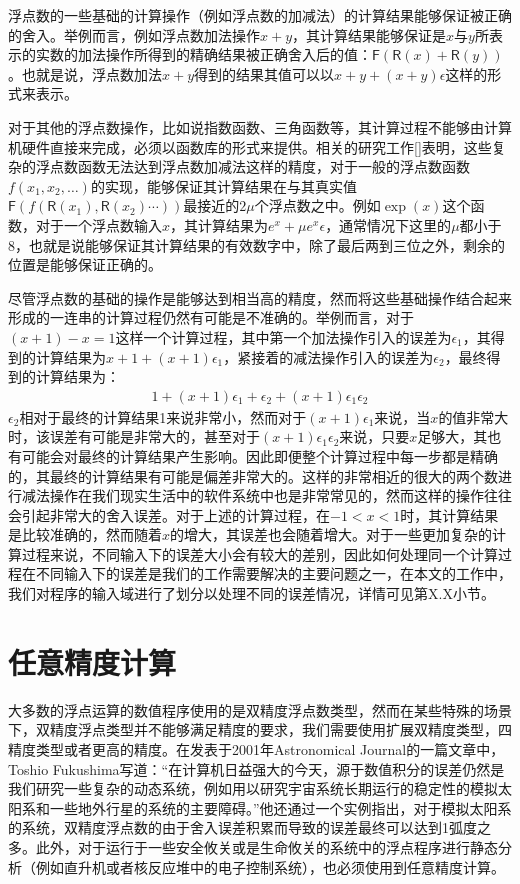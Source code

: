 浮点数的一些基础的计算操作（例如浮点数的加减法）的计算结果能够保证被正确的舍入。举例而言，例如浮点数加法操作$x+y$，其计算结果能够保证是$x$与$y$所表示的实数的加法操作所得到的精确结果被正确舍入后的值：$\mathsf{F}(\mathsf{R}(x)+\mathsf{R}(y))$。也就是说，浮点数加法$x+y$得到的结果其值可以以$x+y+(x+y)\epsilon$这样的形式来表示。

对于其他的浮点数操作，比如说指数函数、三角函数等，其计算过程不能够由计算机硬件直接来完成，必须以函数库的形式来提供。相关的研究工作[]表明，这些复杂的浮点数函数无法达到浮点数加减法这样的精度，对于一般的浮点数函数$f(x_1, x_2, \ldots)$的实现，能够保证其计算结果在与其真实值$\mathsf{F}(f(\mathsf{R}(x_1), \mathsf{R}(x_2) \cdots))$最接近的$2\mu$个浮点数之中。例如$\exp(x)$这个函数，对于一个浮点数输入$x$，其计算结果为$e^x+\mu e^x \epsilon$，通常情况下这里的$\mu$都小于8，也就是说能够保证其计算结果的有效数字中，除了最后两到三位之外，剩余的位置是能够保证正确的。

尽管浮点数的基础的操作是能够达到相当高的精度，然而将这些基础操作结合起来形成的一连串的计算过程仍然有可能是不准确的。举例而言，对于$(x+1)-x = 1$这样一个计算过程，其中第一个加法操作引入的误差为$\epsilon_1$，其得到的计算结果为$x+1+(x+1)\epsilon_1$，紧接着的减法操作引入的误差为$\epsilon_2$，最终得到的计算结果为：
\begin{gather*}
    1+(x+1)\epsilon_1+\epsilon_2+(x+1)\epsilon_1\epsilon_2
\end{gather*}
$\epsilon_2$相对于最终的计算结果1来说非常小，然而对于$(x+1)\epsilon_1$来说，当$x$的值非常大时，该误差有可能是非常大的，甚至对于$(x+1)\epsilon_1\epsilon_2$来说，只要$x$足够大，其也有可能会对最终的计算结果产生影响。因此即便整个计算过程中每一步都是精确的，其最终的计算结果有可能是偏差非常大的。这样的非常相近的很大的两个数进行减法操作在我们现实生活中的软件系统中也是非常常见的，然而这样的操作往往会引起非常大的舍入误差。对于上述的计算过程，在$-1<x<1$时，其计算结果是比较准确的，然而随着$x$的增大，其误差也会随着增大。对于一些更加复杂的计算过程来说，不同输入下的误差大小会有较大的差别，因此如何处理同一个计算过程在不同输入下的误差是我们的工作需要解决的主要问题之一，在本文的工作中，我们对程序的输入域进行了划分以处理不同的误差情况，详情可见第X.X小节。

\section{任意精度计算}

大多数的浮点运算的数值程序使用的是双精度浮点数类型，然而在某些特殊的场景下，双精度浮点类型并不能够满足精度的要求，我们需要使用扩展双精度类型，四精度类型或者更高的精度。在发表于2001年Astronomical Journal的一篇文章中，Toshio Fukushima写道：“在计算机日益强大的今天，源于数值积分的误差仍然是我们研究一些复杂的动态系统，例如用以研究宇宙系统长期运行的稳定性的模拟太阳系和一些地外行星的系统的主要障碍。”他还通过一个实例指出，对于模拟太阳系的系统，双精度浮点数的由于舍入误差积累而导致的误差最终可以达到1弧度之多。此外，对于运行于一些安全攸关或是生命攸关的系统中的浮点程序进行静态分析（例如直升机或者核反应堆中的电子控制系统），也必须使用到任意精度计算。

